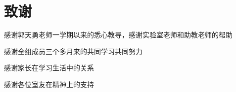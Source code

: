 
\chapter*{致谢}
感谢郭天勇老师一学期以来的悉心教导，感谢实验室老师和助教老师的帮助


感谢全组成员三个多月来的共同学习共同努力


感谢家长在学习生活中的关系


感谢各位室友在精神上的支持
